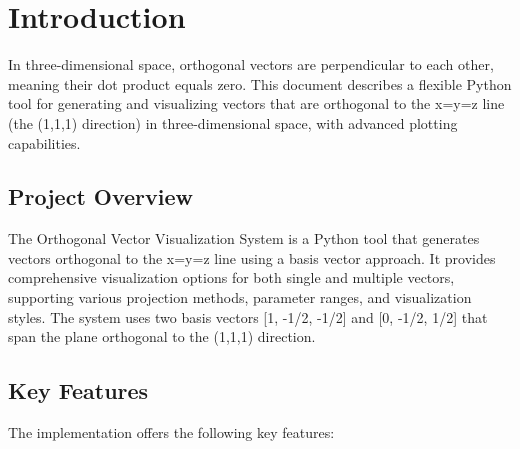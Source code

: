 \newpage
\section{Introduction}

In three-dimensional space, orthogonal vectors are perpendicular to each other, meaning their dot product equals zero. This document describes a flexible Python tool for generating and visualizing vectors that are orthogonal to the x=y=z line (the (1,1,1) direction) in three-dimensional space, with advanced plotting capabilities.

\subsection{Project Overview}

The Orthogonal Vector Visualization System is a Python tool that generates vectors orthogonal to the x=y=z line using a basis vector approach. It provides comprehensive visualization options for both single and multiple vectors, supporting various projection methods, parameter ranges, and visualization styles. The system uses two basis vectors [1, -1/2, -1/2] and [0, -1/2, 1/2] that span the plane orthogonal to the (1,1,1) direction.

\subsection{Key Features}

The implementation offers the following key features:

